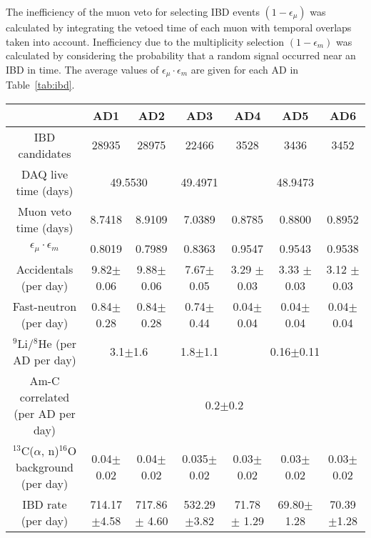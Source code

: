 \documentclass[aps,prl,showpacs,showkeys,amsmath,amssymb,
twocolumn,
floatfix,
superscriptaddress
]{revtex4-1}
\begin{document}
\par
The inefficiency of the muon veto for selecting IBD events $(1-\epsilon_{\mu})$ was calculated by integrating the vetoed time of each muon with temporal overlaps taken into account. Inefficiency due to the multiplicity selection $(1-\epsilon_{m})$ was calculated by considering the probability that a random signal occurred
near an IBD in time. The average values of $\epsilon_\mu\cdot\epsilon_m$ are given for each AD in Table~\ref{tab:ibd}.

\begin{table*}[!htb]
\begin{tabular}{|c|cc|c|ccc|}
\hline
                  & AD1  & AD2  & AD3 & AD4 & AD5 & AD6 \\
\hline
IBD candidates &  28935  &  28975  &  22466 &  3528  &  3436  &  3452 \\
\hline
DAQ live time (days) & \multicolumn{2}{c|}{49.5530}     &  49.4971  &    &   48.9473  &    \\
\hline
Muon veto time (days) &  8.7418  &  8.9109  &  7.0389  &  0.8785  &  0.8800  & 0.8952  \\
\hline
$\epsilon_{\mu}\cdot\epsilon_{m}$ &  0.8019 &  0.7989  &  0.8363  & 0.9547  &  0.9543  &  0.9538 \\
\hline
Accidentals (per day) &  9.82$\pm$0.06  &  9.88$\pm$0.06  & 7.67$\pm$0.05   &  3.29 $\pm$0.03  &  3.33 $\pm$ 0.03  &  3.12 $\pm$0.03 \\
\hline
Fast-neutron (per day) &  0.84$\pm$0.28  &  0.84$\pm$0.28   &  0.74$\pm$0.44   &  0.04$\pm$0.04  &
 0.04$\pm$0.04 & 0.04$\pm$0.04 \\
\hline
$^9$Li/$^8$He (per AD per day) &  \multicolumn{2}{c|}{3.1$\pm$1.6}  & 1.8$\pm$1.1 & \multicolumn{3}{c|}{0.16$\pm$0.11}   \\
\hline
Am-C correlated (per AD per day) &  \multicolumn{6}{c|}{0.2$\pm$0.2}   \\
\hline
 $^{13}$C($\alpha$, n)$^{16}$O background (per day)&  0.04$\pm$0.02  &  0.04$\pm$0.02  & 0.035$\pm$0.02 & 0.03$\pm$0.02  & 0.03$\pm$0.02 & 0.03$\pm$0.02   \\
\hline
IBD rate (per day) &  714.17$\pm$4.58  & 717.86$\pm$ 4.60 & 532.29$\pm$3.82  & 71.78 $\pm$ 1.29  & 69.80$\pm$1.28  & 70.39$\pm$1.28 \\
\hline
\end{tabular}
\caption{Signal and background summary. The background and IBD rates were corrected for the $\epsilon_{\mu}\cdot\epsilon_{m}$ efficiency. \label{tab:ibd}  }
\end{table*}
\end{document}
